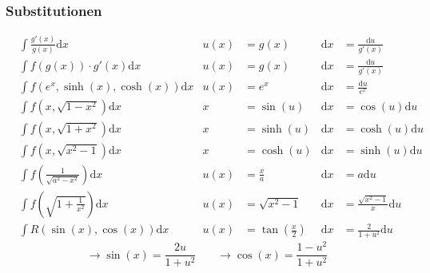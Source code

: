 \documentclass[8pt, a4paper, landscape, fleqn]{scrartcl}
\begin{document}
\begin{multicols*}{3}
				\subsubsection{Substitutionen}
					\label{sec:substitution}
					\vspace{-7pt}
					\begin{small}
						\begin{align*}
							&\int \frac{g'(x)}{g(x)}\text{d}x &u(x)&=g(x) &\text{d}x&=\frac{\text{d}u}{g'(x)}\\
							&\int f(g(x))\cdot g'(x)\text{d}x &u(x)&=g(x) &\text{d}x&=\frac{\text{d}u}{g'(x)}\\
							&\int f(e^x, \sinh(x), \cosh(x))\text{d}x &u(x)&=e^x &\text{d}x&=\frac{\text{d}u}{e^x}\\			
							&\int f(x, \sqrt{1-x^2})\text{d}x &x&=\sin(u) &\text{d}x&=\cos(u)\text{d}u\\
							&\int f(x, \sqrt{1+x^2})\text{d}x &x&=\sinh(u) &\text{d}x&=\cosh(u)\text{d}u\\
							&\int f(x, \sqrt{x^2-1})\text{d}x &x&=\cosh(u) &\text{d}x&=\sinh(u)\text{d}u\\
							&\int f\left(\frac{1}{\sqrt{a^2-x^2}}\right)\text{d}x &u(x)&=\frac{x}{a} &\text{d}x&=a\text{d}u\\
							&\int f\left(\sqrt{1+\frac{1}{x^2}}\right)\text{d}x &u(x)&=\sqrt{x^2-1} &\text{d}x&=\frac{\sqrt{x^2-1}}{x} \text{d}u\\
							&\int R(\sin(x), \cos(x))\text{d}x &u(x)&=\tan\left(\frac{x}{2}\right) &\text{d}x&=\frac{2}{1+u^2}\text{d}u
						\end{align*}
						\begin{equation*}
							\rightarrow \sin(x)=\frac{2u}{1+u^2} \hspace{22pt} \rightarrow \cos(x)=\frac{1-u^2}{1+u^2}
						\end{equation*}
						\vspace{-7pt}
					\end{small}

\end{multicols*}
\end{document}
